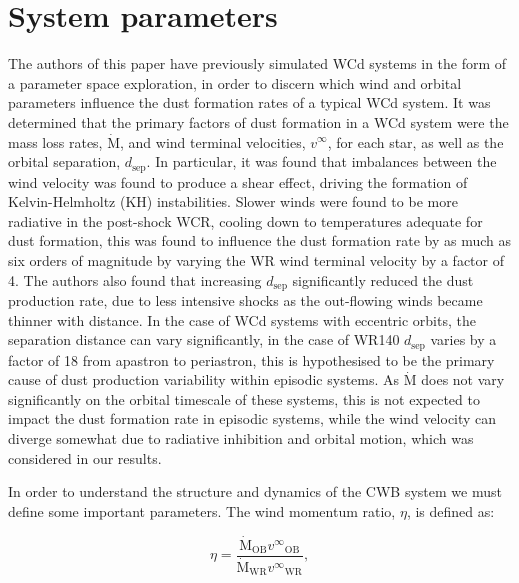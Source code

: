 \documentclass[fleqn,usenatbib]{mnras}
\newcommand{\swr}{\ensuremath{_{\text{WR}}}}
\newcommand{\sob}{\ensuremath{_{\text{OB}}}}
\newcommand{\rms}[1]{\ensuremath{_{\text{#1}}}}
\newcommand{\mdot}{\dot{\text{M}}}
\newcommand{\dsep}{d\rms{sep}}
\begin{document}
\section{System parameters}
\label{sec:paper2-wr140}

The authors of this paper have previously simulated WCd systems in the form of a parameter space exploration, in order to discern which wind and orbital parameters influence the dust formation rates of a typical WCd system.
It was determined that the primary factors of dust formation in a WCd system were the mass loss rates, $\mdot$, and wind terminal velocities, $v^\infty$, for each star, as well as the orbital separation, $d\rms{sep}$.
In particular, it was found that imbalances between the wind velocity was found to produce a shear effect, driving the formation of Kelvin-Helmholtz (KH) instabilities.
Slower winds were found to be more radiative in the post-shock WCR, cooling down to temperatures adequate for dust formation, this was found to influence the dust formation rate by as much as six orders of magnitude by varying the WR wind terminal velocity by a factor of 4.
The authors also found that increasing $d\rms{sep}$ significantly reduced the dust production rate, due to less intensive shocks as the out-flowing winds became thinner with distance.
In the case of WCd systems with eccentric orbits, the separation distance can vary significantly, in the case of WR140 $\dsep$ varies by a factor of 18 from apastron to periastron, this is hypothesised to be the primary cause of dust production variability within episodic systems.
As $\mdot$ does not vary significantly on the orbital timescale of these systems, this is not expected to impact the dust formation rate in episodic systems, while the wind velocity can diverge somewhat due to radiative inhibition and orbital motion, which was considered in our results.

In order to understand the structure and dynamics of the CWB system we must define some important parameters.
The wind momentum ratio, $\eta$, is defined as:

\begin{equation}
  \eta = \frac{\mdot\sob v^\infty\sob}{\mdot\swr v^\infty\swr},
\end{equation}
\end{document}
